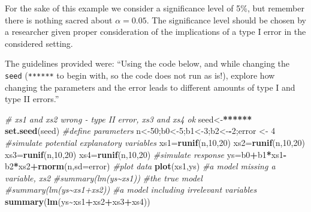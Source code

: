 \documentclass[
]{book}
\newenvironment{Shaded}{\begin{snugshade}}{\end{snugshade}}
\newcommand{\AttributeTok}[1]{\textcolor[rgb]{0.13,0.29,0.53}{#1}}
\newcommand{\CommentTok}[1]{\textcolor[rgb]{0.56,0.35,0.01}{\textit{#1}}}
\newcommand{\DecValTok}[1]{\textcolor[rgb]{0.00,0.00,0.81}{#1}}
\newcommand{\ErrorTok}[1]{\textcolor[rgb]{0.64,0.00,0.00}{\textbf{#1}}}
\newcommand{\FunctionTok}[1]{\textcolor[rgb]{0.13,0.29,0.53}{\textbf{#1}}}
\newcommand{\NormalTok}[1]{#1}
\newcommand{\OtherTok}[1]{\textcolor[rgb]{0.56,0.35,0.01}{#1}}
\newcommand{\SpecialCharTok}[1]{\textcolor[rgb]{0.81,0.36,0.00}{\textbf{#1}}}
\begin{document}
For the sake of this example we consider a significance level of 5\%, but remember there is nothing sacred about \(\alpha=0.05\). The significance level should be chosen by a researcher given proper consideration of the implications of a type I error in the considered setting.

The guidelines provided were: ``Using the code below, and while changing the \texttt{seed} (\texttt{******} to begin with, so the code does not run as is!), explore how changing the parameters and the error leads to different amounts of type I and type II errors.''

\begin{Shaded}
\begin{Highlighting}[]
\CommentTok{\# xs1 and xs2 wrong {-} type II error, xs3 and xs4 ok}
\NormalTok{seed}\OtherTok{\textless{}{-}}\ErrorTok{******}
\FunctionTok{set.seed}\NormalTok{(seed)}
\CommentTok{\#define parameters}
\NormalTok{n}\OtherTok{\textless{}{-}}\DecValTok{50}\NormalTok{;b0}\OtherTok{\textless{}{-}}\DecValTok{5}\NormalTok{;b1}\OtherTok{\textless{}{-}}\DecValTok{3}\NormalTok{;b2}\OtherTok{\textless{}{-}}\SpecialCharTok{{-}}\DecValTok{2}\NormalTok{;error }\OtherTok{\textless{}{-}} \DecValTok{4}
\CommentTok{\#simulate potential explanatory variables}
\NormalTok{xs1}\OtherTok{=}\FunctionTok{runif}\NormalTok{(n,}\DecValTok{10}\NormalTok{,}\DecValTok{20}\NormalTok{)}
\NormalTok{xs2}\OtherTok{=}\FunctionTok{runif}\NormalTok{(n,}\DecValTok{10}\NormalTok{,}\DecValTok{20}\NormalTok{)}
\NormalTok{xs3}\OtherTok{=}\FunctionTok{runif}\NormalTok{(n,}\DecValTok{10}\NormalTok{,}\DecValTok{20}\NormalTok{)}
\NormalTok{xs4}\OtherTok{=}\FunctionTok{runif}\NormalTok{(n,}\DecValTok{10}\NormalTok{,}\DecValTok{20}\NormalTok{)}
\CommentTok{\#simulate response}
\NormalTok{ys}\OtherTok{=}\NormalTok{b0}\SpecialCharTok{+}\NormalTok{b1}\SpecialCharTok{*}\NormalTok{xs1}\SpecialCharTok{{-}}\NormalTok{b2}\SpecialCharTok{*}\NormalTok{xs2}\SpecialCharTok{+}\FunctionTok{rnorm}\NormalTok{(n,}\AttributeTok{sd=}\NormalTok{error)}
\CommentTok{\#plot data}
\FunctionTok{plot}\NormalTok{(xs1,ys)}
\CommentTok{\#a model missing a variable, xs2}
\CommentTok{\#summary(lm(ys\textasciitilde{}xs1))}
\CommentTok{\#the true model}
\CommentTok{\#summary(lm(ys\textasciitilde{}xs1+xs2))}
\CommentTok{\#a model including irrelevant variables}
\FunctionTok{summary}\NormalTok{(}\FunctionTok{lm}\NormalTok{(ys}\SpecialCharTok{\textasciitilde{}}\NormalTok{xs1}\SpecialCharTok{+}\NormalTok{xs2}\SpecialCharTok{+}\NormalTok{xs3}\SpecialCharTok{+}\NormalTok{xs4))}
\end{Highlighting}
\end{Shaded}
\end{document}
